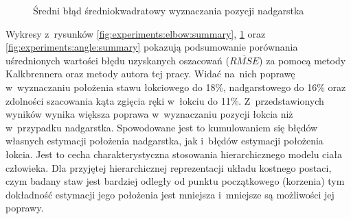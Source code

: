 \begin{savenotes}
	\begin{figure}[hbp]
		\centering
		\caption{Średni błąd średniokwadratowy wyznaczania pozycji nadgarstka}
		\label{fig:experiments:wrist:summary}
	\end{figure}
\end{savenotes}

Wykresy z~rysunków \ref{fig:experiments:elbow:summary}, \ref{fig:experiments:wrist:summary} oraz \ref{fig:experiments:angle:summary} pokazują podsumowanie porównania uśrednionych wartości błędu uzyskanych oszacowań ($\overline{RMSE}$) za pomocą metody Kalkbrennera oraz metody autora tej pracy.
Widać na~nich poprawę w~wyznaczaniu położenia stawu łokciowego do 18\%, nadgarstowego do 16\% oraz zdolności szacowania kąta zgięcia ręki w~łokciu do 11\%. Z~przedstawionych wyników wynika większa poprawa w~wyznaczaniu pozycji łokcia niż w~przypadku nadgarstka. Spowodowane jest to kumulowaniem się błędów własnych estymacji położenia nadgarstka, jak i~błędów estymacji położenia łokcia. Jest to cecha charakterystyczna stosowania hierarchicznego modelu ciała człowieka. Dla przyjętej hierarchicznej reprezentacji układu kostnego postaci, czym badany staw jest bardziej odległy od punktu początkowego (korzenia) tym dokładność estymacji jego położenia jest mniejsza i~mniejsze są możliwości jej poprawy.\\

